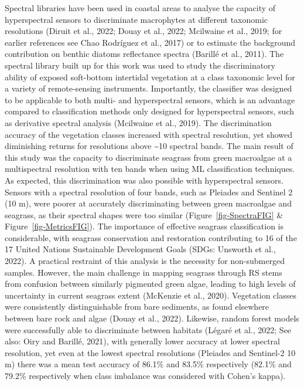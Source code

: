 \documentclass[
  letterpaper,
  11pt,
  english,
  singlespacing,
  headsepline]{MastersDoctoralThesis}
\begin{document}
\begin{spacing}{1.5}
Spectral libraries have been used in coastal areas to analyse the
capacity of hyperspectral sensors to discriminate macrophytes at
different taxonomic resolutions (Diruit et al., 2022; Douay et al.,
2022; Mcilwaine et al., 2019; for earlier references see Chao Rodríguez
et al., 2017) or to estimate the background contribution on benthic
diatoms reflectance spectra (Barillé et al., 2011). The spectral library
built up for this work was used to study the discriminatory ability of
exposed soft-bottom intertidal vegetation at a class taxonomic level for
a variety of remote-sensing instruments. Importantly, the classifier was
designed to be applicable to both multi- and hyperspectral sensors,
which is an advantage compared to classification methods only designed
for hyperspectral sensors, such as derivative spectral analysis
(Mcilwaine et al., 2019). The discrimination accuracy of the vegetation
classes increased with spectral resolution, yet showed diminishing
returns for resolutions above \textasciitilde10 spectral bands. The main
result of this study was the capacity to discriminate seagrass from
green macroalgae at a multispectral resolution with ten bands when using
ML classification techniques. As expected, this discrimination was also
possible with hyperspectral sensors. Sensors with a spectral resolution
of four bands, such as Pleiades and Sentinel 2 (10 m), were poorer at
accurately discriminating between green macroalgae and seagrass, as
their spectral shapes were too similar (Figure~\ref{fig-SpectraFIG} \&
Figure~\ref{fig-MetricsFIG}). The importance of effective seagrass
classification is considerable, with seagrass conservation and
restoration contributing to 16 of the 17 United Nations Sustainable
Development Goals (SDGs: Unsworth et al., 2022). A practical restraint
of this analysis is the necessity for non-submerged samples. However,
the main challenge in mapping seagrass through RS stems from confusion
between similarly pigmented green algae, leading to high levels of
uncertainty in current seagrass extent (McKenzie et al., 2020).
Vegetation classes were consistently distinguishable from bare
sediments, as found elsewhere between bare rock and algae (Douay et al.,
2022). Likewise, random forest models were successfully able to
discriminate between habitats (Légaré et al., 2022; See also: Oiry and
Barillé, 2021), with generally lower accuracy at lower spectral
resolution, yet even at the lowest spectral resolutions (Pleiades and
Sentinel-2 10 m) there was a mean test accuracy of 86.1\% and 83.5\%
respectively (82.1\% and 79.2\% respectively when class imbalance was
considered with Cohen's kappa).


\end{spacing}
\end{document}
